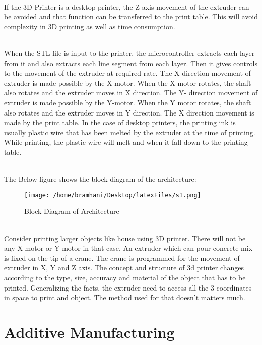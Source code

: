 \documentclass[12pt,a4paper]{report}
\begin{document}
	\indent
	\\If the 3D-Printer is a desktop printer, the Z axis movement of the extruder can be avoided and that
	function can be transferred to the print table. This will avoid complexity in 3D printing as well as
	time consumption.\par
	
	\indent
	\\When the STL file is input to the printer, the microcontroller extracts each layer from it and
	also extracts each line segment from each layer. Then it gives controls to the movement of the
	extruder at required rate. The X-direction movement of extruder is made possible by the X-motor.
	When the X motor rotates, the shaft also rotates and the extruder moves in X direction. The Y-
	direction movement of extruder is made possible by the Y-motor. When the Y motor rotates, the
	shaft also rotates and the extruder moves in Y direction. The X direction movement is made by the
	print table. In the case of desktop printers, the printing ink is usually plastic wire that has been
	melted by the extruder at the time of printing. While printing, the plastic wire will melt and when it
	fall down to the printing table.\par
		\noindent
	\\The Below figure shows the block diagram of the architecture:
	\begin{figure}[H]
		\centering
		\texttt{[image: /home/bramhani/Desktop/latexFiles/s1.png]}
		\label{fig:Block Diagram of Architecture}
		\caption{Block Diagram of Architecture}
	\end{figure}
	
	\indent
	\\Consider printing larger objects like house using 3D printer. There will not be any X motor or
	Y motor in that case. An extruder which can pour concrete mix is fixed on the tip of a crane. The
	crane is programmed for the movement of extruder in X, Y and Z axis. The concept and structure of
	3d printer changes according to the type, size, accuracy and material of the object that has to be
	printed. Generalizing the facts, the extruder need to access all the 3 coordinates in space to print and
	object. The method used for that doesn’t matters much.\par
	
	\chapter{Additive Manufacturing}
	\setlength{\parindent}{10ex} 
	
\end{document}

